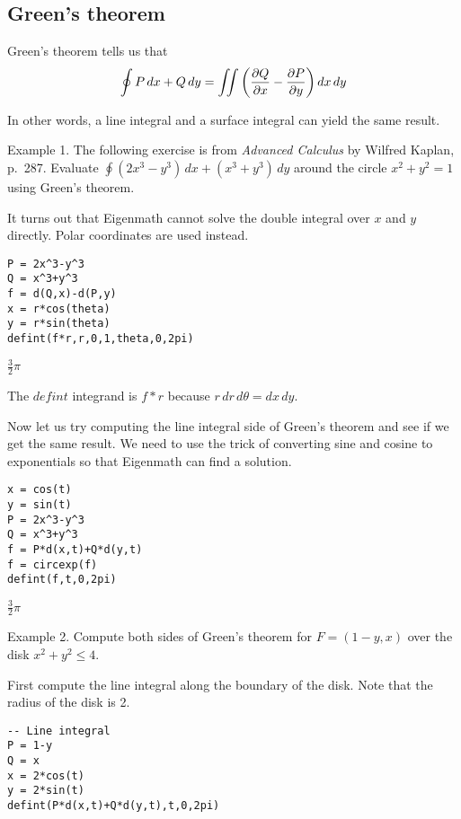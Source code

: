 
\subsection{Green's theorem}
Green's theorem tells us that
$$\oint P\,dx+Q\,dy=\int\!\!\!\int
\left({\partial Q\over\partial x}-{\partial P\over\partial y}\right)
dx\,dy$$

\noindent
In other words, a line integral and a surface integral can yield
the same result.

\bigskip
\noindent
Example 1.
The following exercise is from {\it Advanced Calculus}
by Wilfred Kaplan, p.~287.
Evaluate $\oint (2x^3-y^3)\,dx+(x^3+y^3)\,dy$ around the circle
$x^2+y^2=1$ using Green's theorem.

\bigskip
\noindent
It turns out that Eigenmath cannot solve the double integral over
$x$ and $y$ directly.
Polar coordinates are used instead.

\begin{Verbatim}[formatcom=\color{blue},samepage=true]
P = 2x^3-y^3
Q = x^3+y^3
f = d(Q,x)-d(P,y)
x = r*cos(theta)
y = r*sin(theta)
defint(f*r,r,0,1,theta,0,2pi)
\end{Verbatim}

\noindent
$\displaystyle \frac{3}{2}\pi$

\bigskip
\noindent
The $defint$ integrand is $f{*}r$ because $r\,dr\,d\theta=dx\,dy$.

\bigskip
\noindent
Now let us try computing the line integral side of Green's theorem
and see if we get the same result.
We need to use the trick of converting sine and cosine to exponentials
so that Eigenmath can find a solution.

\begin{Verbatim}[formatcom=\color{blue},samepage=true]
x = cos(t)
y = sin(t)
P = 2x^3-y^3
Q = x^3+y^3
f = P*d(x,t)+Q*d(y,t)
f = circexp(f)
defint(f,t,0,2pi)
\end{Verbatim}

\noindent
$\displaystyle \frac{3}{2}\pi$

\bigskip
\noindent
Example 2.
Compute both sides of Green's theorem for
$F=(1-y,x)$ over the disk $x^2+y^2\le4$.

\bigskip
\noindent
First compute the line integral along the boundary of the disk.
Note that the radius of the disk is 2.

\begin{Verbatim}[formatcom=\color{blue},samepage=true]
-- Line integral
P = 1-y
Q = x
x = 2*cos(t)
y = 2*sin(t)
defint(P*d(x,t)+Q*d(y,t),t,0,2pi)
\end{Verbatim}

